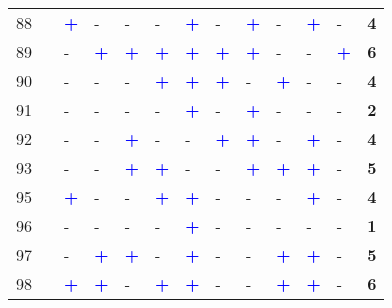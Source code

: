 \begin{longtable}{p{0.5cm}p{4.6cm}p{0.3cm}p{0.3cm}p{0.3cm}p{0.3cm}p{0.3cm}p{0.3cm}p{0.3cm}p{0.3cm}p{0.3cm}p{0.3cm}p{1cm}}
    \small{88} & \small{\textcite{ji_public_2017}}\index{Ji, Yanjie|pagebf} & \textcolor{blue}{\textbf{+}} & - & - & - & \textcolor{blue}{\textbf{+}} & - & \textcolor{blue}{\textbf{+}} & - & \textcolor{blue}{\textbf{+}} & - & \textbf{4}\\
    \small{89} & \small{\textcite{ji_exploring_2018}}\index{Ji, Yanjie|pagebf} & - & \textcolor{blue}{\textbf{+}} & \textcolor{blue}{\textbf{+}} & \textcolor{blue}{\textbf{+}} & \textcolor{blue}{\textbf{+}} & \textcolor{blue}{\textbf{+}} & \textcolor{blue}{\textbf{+}} & - & - & \textcolor{blue}{\textbf{+}} & \textbf{6}\\
    \small{90} & \small{\textcite{jin_competition_2019}}\index{Jin, Haitao|pagebf} & - & - & - & \textcolor{blue}{\textbf{+}} & \textcolor{blue}{\textbf{+}} & \textcolor{blue}{\textbf{+}} & - & \textcolor{blue}{\textbf{+}} & - & - & \textbf{4}\\
    \small{91} & \small{\textcite{chen_demand_2013}}\index{Chen, Jingxu|pagebf} & - & - & - & - & \textcolor{blue}{\textbf{+}} & - & \textcolor{blue}{\textbf{+}} & - & - & - & \textbf{2}\\
    \small{92} & \small{\textcite{jonkeren_bicycle_2021}}\index{Jonkeren, Olaf|pagebf} & - & - & \textcolor{blue}{\textbf{+}} & - & - & \textcolor{blue}{\textbf{+}} & \textcolor{blue}{\textbf{+}} & - & \textcolor{blue}{\textbf{+}} & - & \textbf{4}\\
    \small{93} & \small{\textcite{jonkeren_bicycle-train_2021}}\index{Jonkeren, Olaf|pagebf} & - & - & \textcolor{blue}{\textbf{+}} & \textcolor{blue}{\textbf{+}} & - & - & \textcolor{blue}{\textbf{+}} & \textcolor{blue}{\textbf{+}} & \textcolor{blue}{\textbf{+}} & - & \textbf{5}\\
    \small{95} & \small{\textcite{kager_characterisation_2016}}\index{Kager, Roland|pagebf} & \textcolor{blue}{\textbf{+}} & - & - & \textcolor{blue}{\textbf{+}} & \textcolor{blue}{\textbf{+}} & - & - & - & \textcolor{blue}{\textbf{+}} & - & \textbf{4}\\
    \small{96} & \small{\textcite{keijer_how_2000}}\index{Keijer, Majanka|pagebf} & - & - & - & - & \textcolor{blue}{\textbf{+}} & - & - & - & - & - & \textbf{1}\\
    \small{97} & \small{\textcite{kim_analysis_2021}}\index{Kim, Minjun|pagebf} & - & \textcolor{blue}{\textbf{+}} & \textcolor{blue}{\textbf{+}} & - & \textcolor{blue}{\textbf{+}} & - & - & \textcolor{blue}{\textbf{+}} & \textcolor{blue}{\textbf{+}} & - & \textbf{5}\\
    \small{98} & \small{\textcite{kong_deciphering_2020}}\index{Kong, Hui|pagebf} & \textcolor{blue}{\textbf{+}} & \textcolor{blue}{\textbf{+}} & - & \textcolor{blue}{\textbf{+}} & \textcolor{blue}{\textbf{+}} & - & - & \textcolor{blue}{\textbf{+}} & \textcolor{blue}{\textbf{+}} & - & \textbf{6}\\

\end{longtable}
